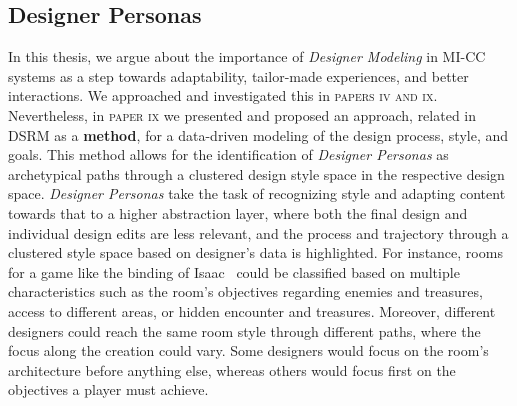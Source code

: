 
\subsection{Designer Personas}

In this thesis, we argue about the importance of \emph{Designer Modeling} in MI-CC systems as a step towards adaptability, tailor-made experiences, and better interactions. We approached and investigated this in \textsc{papers iv and ix}. Nevertheless, in \textsc{paper ix} we presented and proposed an approach, related in DSRM as a \textbf{method}, for a data-driven modeling of the design process, style, and goals. This method allows for the identification of \emph{Designer Personas} as archetypical paths through a clustered design style space in the respective design space. \emph{Designer Personas} take the task of recognizing style and adapting content towards that to a higher abstraction layer, where both the final design and individual design edits are less relevant, and the process and trajectory through a clustered style space based on designer's data is highlighted.  For instance, rooms for a game like the binding of Isaac~\cite{mcmillen_binding_2011} could be classified based on multiple characteristics such as the room's objectives regarding enemies and treasures, access to different areas, or hidden encounter and treasures. Moreover, different designers could reach the same room style through different paths, where the focus along the creation could vary. Some designers would focus on the room's architecture before anything else, whereas others would focus first on the objectives a player must achieve.

